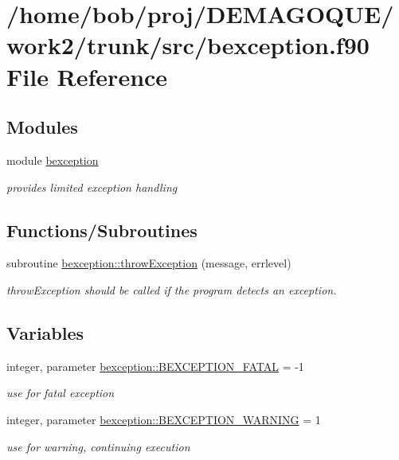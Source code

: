 \hypertarget{bexception_8f90}{
\section{/home/bob/proj/DEMAGOQUE/work2/trunk/src/bexception.f90 File Reference}
\label{bexception_8f90}
}
\subsection*{Modules}
\begin{DoxyCompactItemize}
\item 
module \hyperlink{namespacebexception}{bexception}


\begin{DoxyCompactList}\small\item\em provides limited exception handling \item\end{DoxyCompactList}

\end{DoxyCompactItemize}
\subsection*{Functions/Subroutines}
\begin{DoxyCompactItemize}
\item 
subroutine \hyperlink{namespacebexception_ab1589d4ac40e6a8d667205910c28cd35}{bexception::throwException} (message, errlevel)
\begin{DoxyCompactList}\small\item\em throwException should be called if the program detects an exception. \item\end{DoxyCompactList}\end{DoxyCompactItemize}
\subsection*{Variables}
\begin{DoxyCompactItemize}
\item 
integer, parameter \hyperlink{namespacebexception_a0136bbb877e7f3f250df94edc06d6906}{bexception::BEXCEPTION\_\-FATAL} = -\/1
\begin{DoxyCompactList}\small\item\em use for fatal exception \item\end{DoxyCompactList}\item 
integer, parameter \hyperlink{namespacebexception_a8f7fabc18e6fc4a081836a0e0401b94c}{bexception::BEXCEPTION\_\-WARNING} = 1
\begin{DoxyCompactList}\small\item\em use for warning, continuing execution \item\end{DoxyCompactList}\end{DoxyCompactItemize}
